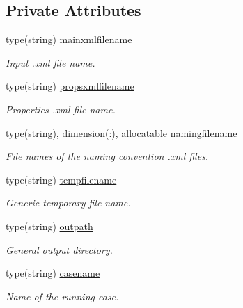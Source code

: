 \subsection*{Private Attributes}
\begin{DoxyCompactItemize}
\item 
type(string) \mbox{\hyperlink{structsimulationglobals__mod_1_1filenames__t_a5af6fa9ef520239ea544e0241a03259d}{mainxmlfilename}}
\begin{DoxyCompactList}\small\item\em Input .xml file name. \end{DoxyCompactList}\item 
type(string) \mbox{\hyperlink{structsimulationglobals__mod_1_1filenames__t_aa68e6aa970dcc2fb6ef62f5c20373948}{propsxmlfilename}}
\begin{DoxyCompactList}\small\item\em Properties .xml file name. \end{DoxyCompactList}\item 
type(string), dimension(\+:), allocatable \mbox{\hyperlink{structsimulationglobals__mod_1_1filenames__t_ab9bfe3490032ac0fe0ff585f4ccf81ba}{namingfilename}}
\begin{DoxyCompactList}\small\item\em File names of the naming convention .xml files. \end{DoxyCompactList}\item 
type(string) \mbox{\hyperlink{structsimulationglobals__mod_1_1filenames__t_a65117f3cf40366162812c184decc8298}{tempfilename}}
\begin{DoxyCompactList}\small\item\em Generic temporary file name. \end{DoxyCompactList}\item 
type(string) \mbox{\hyperlink{structsimulationglobals__mod_1_1filenames__t_aa8af9fb10dcd5d2f5dfc0fe299a16755}{outpath}}
\begin{DoxyCompactList}\small\item\em General output directory. \end{DoxyCompactList}\item 
type(string) \mbox{\hyperlink{structsimulationglobals__mod_1_1filenames__t_a5a53822ea60d4941a19739cacb957469}{casename}}
\begin{DoxyCompactList}\small\item\em Name of the running case. \end{DoxyCompactList}\end{DoxyCompactItemize}


